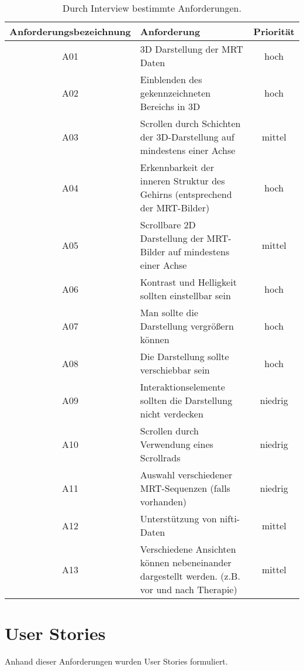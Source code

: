 \begin{table}
\begin{tabular}{|c|p{10cm}|c|}
\hline
Anforderungsbezeichnung & Anforderung & Priorität \\
\hline
A01 & 3D Darstellung der MRT Daten & hoch\\
\hline
A02 & Einblenden des gekennzeichneten Bereichs in 3D & hoch\\
\hline
A03 & Scrollen durch Schichten der 3D-Darstellung auf mindestens einer Achse& mittel\\
\hline
A04 & Erkennbarkeit der inneren Struktur des Gehirns (entsprechend der MRT-Bilder) & hoch\\
\hline
A05 & Scrollbare 2D Darstellung der MRT-Bilder auf mindestens einer Achse & mittel\\
\hline
A06 & Kontrast und Helligkeit sollten einstellbar sein & hoch\\
\hline
A07 & Man sollte die Darstellung vergrößern können & hoch\\
\hline
A08 & Die Darstellung sollte verschiebbar sein & hoch\\
\hline
A09 & Interaktionselemente sollten die Darstellung nicht verdecken & niedrig\\
\hline
A10 & Scrollen durch Verwendung eines Scrollrads & niedrig\\
\hline
A11 & Auswahl verschiedener MRT-Sequenzen (falls vorhanden) & niedrig\\
\hline
A12 & Unterstützung von nifti-Daten & mittel\\
\hline
A13 & Verschiedene Ansichten können nebeneinander dargestellt werden. (z.B. vor und nach Therapie) & mittel\\
\hline

\end{tabular}
\caption{\label{tab:table-name} Durch Interview bestimmte Anforderungen.}
\end{table}

\section{User Stories}

Anhand dieser Anforderungen wurden User Stories formuliert. 

